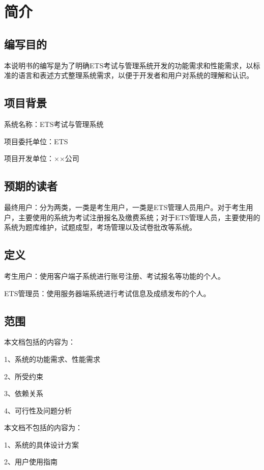 \chapter{简介}

\section{编写目的}
本说明书的编写是为了明确ETS考试与管理系统开发的功能需求和性能需求，以标准的语言和表述方式整理系统需求，以便于开发者和用户对系统的理解和认识。

\section{项目背景}
系统名称：ETS考试与管理系统

项目委托单位：ETS

项目开发单位：××公司

\section{预期的读者}
最终用户：分为两类，一类是考生用户，一类是ETS管理人员用户。对于考生用户，主要使用的系统为考试注册报名及缴费系统；对于ETS管理人员，主要使用的系统为题库维护，试题成型，考场管理以及试卷批改等系统。

\section{定义}
考生用户：使用客户端子系统进行账号注册、考试报名等功能的个人。

ETS管理员：使用服务器端系统进行考试信息及成绩发布的个人。

\section{范围}
本文档包括的内容为：

1、系统的功能需求、性能需求

2、所受约束

3、依赖关系

4、可行性及问题分析

本文档不包括的内容为：

1、系统的具体设计方案

2、用户使用指南
